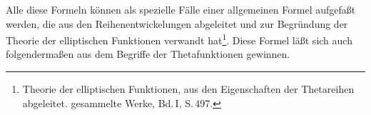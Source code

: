 Alle diese Formeln können als spezielle Fälle einer allgemeinen Formel aufgefaßt werden, die  aus den Reihenentwickelungen abgeleitet und zur Begründung der Theorie der elliptischen Funktionen verwandt hat\footnote{Theorie der elliptischen Funktionen, aus den Eigenschaften der Thetareihen abgeleitet.  gesammelte Werke, Bd.\,I, S.\,497.}. Diese Formel läßt sich auch folgendermaßen aus dem Begriffe der Thetafunktionen gewinnen.
